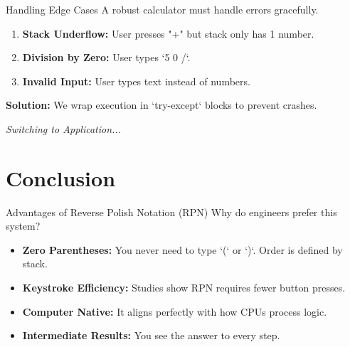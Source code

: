 \documentclass[aspectratio=169]{beamer} %
\begin{document}
	\begin{frame}{Handling Edge Cases}
		A robust calculator must handle errors gracefully.
		\vspace{0.5cm}
		\begin{enumerate}
			\item \textbf{Stack Underflow:} User presses "+" but stack only has 1 number.
			\item \textbf{Division by Zero:} User types `5 0 /`.
			\item \textbf{Invalid Input:} User types text instead of numbers.
		\end{enumerate}
		\vspace{0.5cm}
		\textbf{Solution:} We wrap execution in `try-except` blocks to prevent crashes.
	\end{frame}
	

	
	\begin{frame}
		\centering
		\vspace{1cm}
		\vspace{1cm}
		
		\Large \textit{Switching to Application...}
	\end{frame}
	
	\section{Conclusion}
	
	\begin{frame}{Advantages of Reverse Polish Notation (RPN)}
		Why do engineers prefer this system?
		\vspace{0.3cm}
		\begin{itemize}
			\item[\textcolor{green}{$\checkmark$}] \textbf{Zero Parentheses:} You never need to type `(` or `)`. Order is defined by stack.
			\item[\textcolor{green}{$\checkmark$}] \textbf{Keystroke Efficiency:} Studies show RPN requires fewer button presses.
			\item[\textcolor{green}{$\checkmark$}] \textbf{Computer Native:} It aligns perfectly with how CPUs process logic.
			\item[\textcolor{green}{$\checkmark$}] \textbf{Intermediate Results:} You see the answer to every step.
		\end{itemize}
	\end{frame}
	
\end{document}
